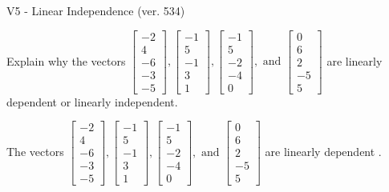 \begin{exercise}
  \begin{exerciseTitle}V5 - Linear Independence (ver. 534)\end{exerciseTitle}
  \begin{exerciseStatement}
    Explain why the vectors \(\left[\begin{array}{r}
-2 \\
4 \\
-6 \\
-3 \\
-5
\end{array}\right] , \left[\begin{array}{r}
-1 \\
5 \\
-1 \\
3 \\
1
\end{array}\right] , \left[\begin{array}{r}
-1 \\
5 \\
-2 \\
-4 \\
0
\end{array}\right] , \text{ and } \left[\begin{array}{r}
0 \\
6 \\
2 \\
-5 \\
5
\end{array}\right]\) are linearly dependent or linearly independent.	


  \end{exerciseStatement}
  \begin{exerciseAnswer}
   The vectors \(\left[\begin{array}{r}
-2 \\
4 \\
-6 \\
-3 \\
-5
\end{array}\right] , \left[\begin{array}{r}
-1 \\
5 \\
-1 \\
3 \\
1
\end{array}\right] , \left[\begin{array}{r}
-1 \\
5 \\
-2 \\
-4 \\
0
\end{array}\right] , \text{ and } \left[\begin{array}{r}
0 \\
6 \\
2 \\
-5 \\
5
\end{array}\right]\) are 
  	 linearly dependent  .
  


  \end{exerciseAnswer}
\end{exercise}